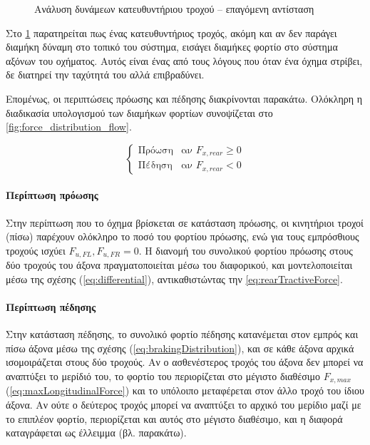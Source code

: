 \begin{figure}[htbp]
    \centering
    
    \caption{Ανάλυση δυνάμεων κατευθυντήριου τροχού -- επαγόμενη αντίσταση}
    \label{fig:inducedDrag}
\end{figure}

Στο \cref{fig:inducedDrag} παρατηρείται πως ένας κατευθυντήριος τροχός, ακόμη και αν δεν παράγει διαμήκη δύναμη στο τοπικό του σύστημα, εισάγει διαμήκες φορτίο στο σύστημα αξόνων του οχήματος. Αυτός είναι ένας από τους λόγους που όταν ένα όχημα στρίβει, δε διατηρεί την ταχύτητά του αλλά επιβραδύνει.

Επομένως, οι περιπτώσεις πρόωσης και πέδησης διακρίνονται παρακάτω. Ολόκληρη η διαδικασία υπολογισμού των διαμήκων φορτίων συνοψίζεται στο \cref{fig:force_distribution_flow}.

\[
    \begin{cases}
        \text{Πρόωση}   & \text{αν } F_{x,rear} \geq 0 \\
        \text{Πέδηση}   & \text{αν } F_{x,rear} < 0 
    \end{cases}
\]


\paragraph{Περίπτωση πρόωσης}
Στην περίπτωση που το όχημα βρίσκεται σε κατάσταση πρόωσης, οι κινητήριοι τροχοί (πίσω) παρέχουν ολόκληρο το ποσό του φορτίου πρόωσης, ενώ για τους εμπρόσθιους τροχούς ισχύει $F_{u,FL},F_{u,FR} = 0$. Η διανομή του συνολικού φορτίου πρόωσης στους δύο τροχούς του άξονα πραγματοποιείται μέσω του διαφορικού, και μοντελοποιείται μέσω της σχέσης (\ref{eq:differential}), αντικαθιστώντας την \cref{eq:rearTractiveForce}.

\paragraph{Περίπτωση πέδησης}
Στην κατάσταση πέδησης, το συνολικό φορτίο πέδησης κατανέμεται στον εμπρός και πίσω άξονα μέσω της σχέσης (\ref{eq:brakingDistribution}), και σε κάθε άξονα αρχικά ισομοιράζεται στους δύο τροχούς. Αν ο ασθενέστερος τροχός του άξονα δεν μπορεί να αναπτύξει το μερίδιό του, το φορτίο του περιορίζεται στο μέγιστο διαθέσιμο $F_{x,max}$ (\cref{eq:maxLongitudinalForce}) και το υπόλοιπο μεταφέρεται στον άλλο τροχό του ίδιου άξονα. Αν ούτε ο δεύτερος τροχός μπορεί να αναπτύξει το αρχικό του μερίδιο μαζί με το επιπλέον φορτίο, περιορίζεται και αυτός στο μέγιστο διαθέσιμο, και η διαφορά καταγράφεται ως έλλειμμα (βλ. παρακάτω).

